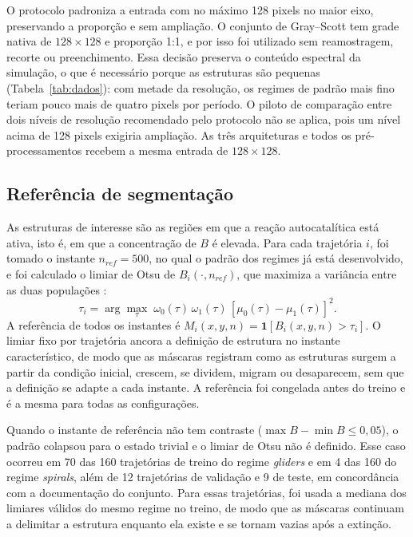 \documentclass[12pt]{article}
\newcommand{\ind}{\mathbf{1}}
\begin{document}


O protocolo padroniza a entrada com no máximo 128 pixels no maior eixo, preservando a proporção e sem ampliação. O conjunto de Gray--Scott tem grade nativa de $128\times128$ e proporção 1:1, e por isso foi utilizado sem reamostragem, recorte ou preenchimento. Essa decisão preserva o conteúdo espectral da simulação, o que é necessário porque as estruturas são pequenas (Tabela~\ref{tab:dados}): com metade da resolução, os regimes de padrão mais fino teriam pouco mais de quatro pixels por período. O piloto de comparação entre dois níveis de resolução recomendado pelo protocolo não se aplica, pois um nível acima de 128 pixels exigiria ampliação. As três arquiteturas e todos os pré-processamentos recebem a mesma entrada de $128\times128$.

\subsection{Referência de segmentação}
\label{subsec:referencia}

As estruturas de interesse são as regiões em que a reação autocatalítica está ativa, isto é, em que a concentração de $B$ é elevada. Para cada trajetória $i$, foi tomado o instante $n_{ref}=500$, no qual o padrão dos regimes já está desenvolvido, e foi calculado o limiar de Otsu de $B_i(\cdot,n_{ref})$, que maximiza a variância entre as duas populações \cite{otsu1979,sezgin2004}:
\begin{equation}
\tau_i=\arg\max_{\tau}\;\omega_0(\tau)\,\omega_1(\tau)\,[\mu_0(\tau)-\mu_1(\tau)]^2 .
\end{equation}
A referência de todos os instantes é $M_i(x,y,n)=\ind[B_i(x,y,n)>\tau_i]$. O limiar fixo por trajetória ancora a definição de estrutura no instante característico, de modo que as máscaras registram como as estruturas surgem a partir da condição inicial, crescem, se dividem, migram ou desaparecem, sem que a definição se adapte a cada instante. A referência foi congelada antes do treino e é a mesma para todas as configurações.

Quando o instante de referência não tem contraste ($\max B-\min B\le0{,}05$), o padrão colapsou para o estado trivial e o limiar de Otsu não é definido. Esse caso ocorreu em 70 das 160 trajetórias de treino do regime \textit{gliders} e em 4 das 160 do regime \textit{spirals}, além de 12 trajetórias de validação e 9 de teste, em concordância com a documentação do conjunto. Para essas trajetórias, foi usada a mediana dos limiares válidos do mesmo regime no treino, de modo que as máscaras continuam a delimitar a estrutura enquanto ela existe e se tornam vazias após a extinção.
\end{document}
